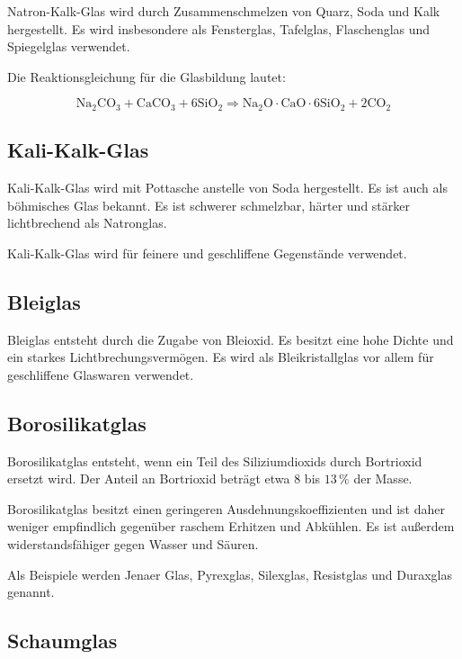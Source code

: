 \documentclass[
  12pt,
  a4paper,
  oneside
]{scrreprt}
\begin{document}
Natron-Kalk-Glas wird durch Zusammenschmelzen von Quarz, Soda und Kalk
hergestellt. Es wird insbesondere als Fensterglas, Tafelglas,
Flaschenglas und Spiegelglas verwendet. 

Die Reaktionsgleichung für die Glasbildung lautet:

\begin{equation}
  \mathrm{
  Na_2CO_3 + CaCO_3 + 6SiO_2
  \Rightarrow
  Na_2O \cdot CaO \cdot 6SiO_2 + 2CO_2
  }
\end{equation}



\subsection{Kali-Kalk-Glas}

Kali-Kalk-Glas wird mit Pottasche anstelle von Soda hergestellt. Es ist
auch als böhmisches Glas bekannt. Es ist schwerer schmelzbar, härter und
stärker lichtbrechend als Natronglas. 

Kali-Kalk-Glas wird für feinere und geschliffene Gegenstände verwendet.


\subsection{Bleiglas}

Bleiglas entsteht durch die Zugabe von Bleioxid. Es besitzt eine hohe
Dichte und ein starkes Lichtbrechungsvermögen. Es wird als
Bleikristallglas vor allem für geschliffene Glaswaren verwendet.


\subsection{Borosilikatglas}

Borosilikatglas entsteht, wenn ein Teil des Siliziumdioxids durch
Bortrioxid ersetzt wird. Der Anteil an Bortrioxid beträgt etwa
$8$ bis $13\,\%$ der Masse. 

Borosilikatglas besitzt einen geringeren Ausdehnungskoeffizienten und
ist daher weniger empfindlich gegenüber raschem Erhitzen und Abkühlen.
Es ist außerdem widerstandsfähiger gegen Wasser und Säuren.


Als Beispiele werden Jenaer Glas, Pyrexglas, Silexglas, Resistglas und
Duraxglas genannt. 

\subsection{Schaumglas}
\end{document}
